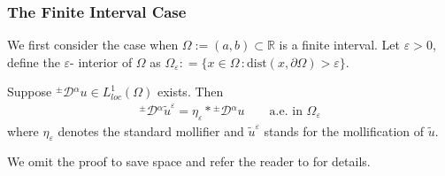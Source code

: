 \documentclass[leqno,final]{siamltex}
\numberwithin{equation}{section}
\newcommand{\eps}{\varepsilon}
\newcommand{\Ome}{{\Omega}}
\renewcommand{\(}{\bigl(}
\renewcommand{\)}{\bigr)}
\newcommand{\R}{\mathbb{R}}
\begin{document}
    \subsubsection{\bf The Finite Interval Case}\label{sec-4.3.1}
     
     We first consider the case when $\Omega:=(a,b) \subset \R$ is a finite interval. Let 
    $\eps > 0$,  define the $\eps$- interior of $\Ome$ as $\Omega_{\eps} : = \{x \in \Omega \, : \mbox{dist}(x,\partial \Omega) >\eps\}.$
    
        
        \begin{lemma}\label{WDMollifier}
           Suppose ${^{\pm}}{\mathcal{D}}{^{\alpha}} u \in L_{loc}^{1} (\Omega)$ exists. Then
            \begin{align}\label{WeakMollifier}
                {^{\pm}}{\mathcal{D}}{^{\alpha}} \tilde{u}^{\eps} = \eta_{\eps} * {^{\pm}}{\mathcal{D}}{^{\alpha}}u \qquad \mbox{a.e. in } \Omega_{\eps}
            \end{align}
 where $\eta_{\eps}$ denotes the standard mollifier and $ \tilde{u}^{\eps} $ stands for the 
 mollification of $\tilde{u}$.
        \end{lemma}
        
      We omit the proof to save space and refer the reader to \cite[Lemma 3.3]{Feng_Sutton} for 
      details. 
      
\end{document}
